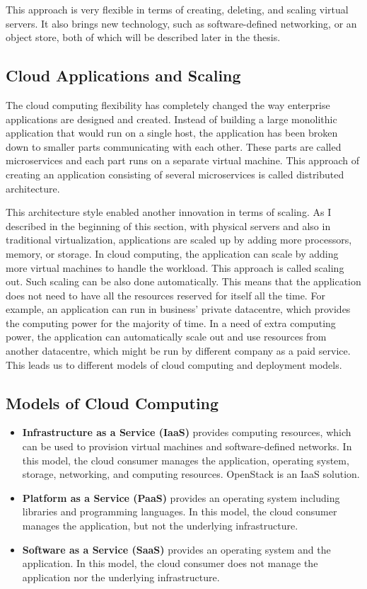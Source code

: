 This approach is very flexible in terms of creating, deleting, and scaling virtual servers. It also brings new technology, such as software-defined networking, or an object store, both of which will be described later in the thesis.

\subsection{Cloud Applications and Scaling}
The cloud computing flexibility has completely changed the way enterprise applications are designed and created. Instead of building a large monolithic application that would run on a single host, the application has been broken down to smaller parts communicating with each other. These parts are called microservices and each part runs on a separate virtual machine. This approach of creating an application consisting of several microservices is called distributed architecture.

This architecture style enabled another innovation in terms of scaling. As I described in the beginning of this section, with physical servers and also in traditional virtualization, applications are scaled up by adding more processors, memory, or storage. In cloud computing, the application can scale by adding more virtual machines to handle the workload. This approach is called scaling out. Such scaling can be also done automatically. This means that the application does not need to have all the resources reserved for itself all the time. For example, an application can run in business’ private datacentre, which provides the computing power for the majority of time. In a need of extra computing power, the application can automatically scale out and use resources from another datacentre, which might be run by different company as a paid service. This leads us to different models of cloud computing and deployment models.

\subsection{Models of Cloud Computing}
\begin{itemize}
  \item{\textbf{Infrastructure as a Service (IaaS)} provides computing resources, which can be used to provision virtual machines and software-defined networks. In this model, the cloud consumer manages the application, operating system, storage, networking, and computing resources. OpenStack is an IaaS solution.}
  \item{\textbf{Platform as a Service (PaaS)} provides an operating system including libraries and programming languages. In this model, the cloud consumer manages the application, but not the underlying infrastructure.}
  \item{\textbf{Software as a Service (SaaS)} provides an operating system and the application. In this model, the cloud consumer does not manage the application nor the underlying infrastructure.}
  \\ \cite{CL210}
\end{itemize}


